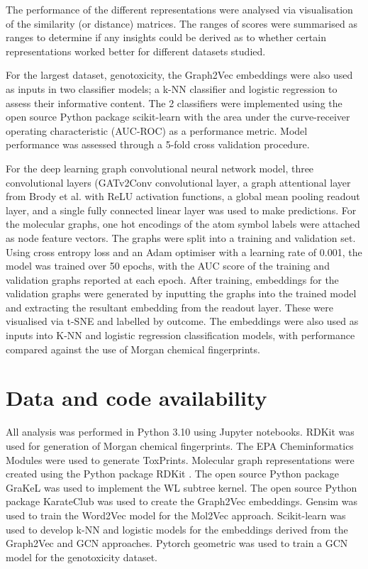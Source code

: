 \documentclass[
  super,
  preprint,
  3p]{elsarticle}
\begin{document}
The performance of the different representations were analysed via
visualisation of the similarity (or distance) matrices. The ranges of
scores were summarised as ranges to determine if any insights could be
derived as to whether certain representations worked better for
different datasets studied.

For the largest dataset, genotoxicity, the Graph2Vec embeddings were
also used as inputs in two classifier models; a k-NN classifier and
logistic regression to assess their informative content. The 2
classifiers were implemented using the open source Python package
scikit-learn \citep{RN53} with the area under the curve-receiver
operating characteristic (AUC-ROC) as a performance metric. Model
performance was assessed through a 5-fold cross validation procedure.

For the deep learning graph convolutional neural network model, three
convolutional layers (GATv2Conv convolutional layer, a graph attentional
layer from Brody et al. \citep{RN56} with ReLU activation functions, a
global mean pooling readout layer, and a single fully connected linear
layer was used to make predictions. For the molecular graphs, one hot
encodings of the atom symbol labels were attached as node feature
vectors. The graphs were split into a training and validation set. Using
cross entropy loss and an Adam optimiser with a learning rate of 0.001,
the model was trained over 50 epochs, with the AUC score of the training
and validation graphs reported at each epoch. After training, embeddings
for the validation graphs were generated by inputting the graphs into
the trained model and extracting the resultant embedding from the
readout layer. These were visualised via t-SNE
\citep{van_er_maaten_visualizing_2018} and labelled by outcome. The
embeddings were also used as inputs into K-NN and logistic regression
classification models, with performance compared against the use of
Morgan chemical fingerprints.

\section{Data and code availability}\label{data-and-code-availability}

All analysis was performed in Python 3.10 using Jupyter notebooks. RDKit
was used for generation of Morgan chemical fingerprints. The EPA
Cheminformatics Modules were used to generate ToxPrints. Molecular graph
representations were created using the Python package RDKit
\citep{landrum_rdkit}. The open source Python package GraKeL
\citep{siglidis_grakel_2020} was used to implement the WL subtree
kernel. The open source Python package KarateClub was used to create the
Graph2Vec embeddings. Gensim \citep{rehurek2011gensim} was used to train
the Word2Vec model for the Mol2Vec approach. Scikit-learn \citep{RN53}
was used to develop k-NN and logistic models for the embeddings derived
from the Graph2Vec and GCN approaches. Pytorch geometric
\citep{fey2019fastgraphrepresentationlearning} was used to train a GCN
model for the genotoxicity dataset.
\end{document}
